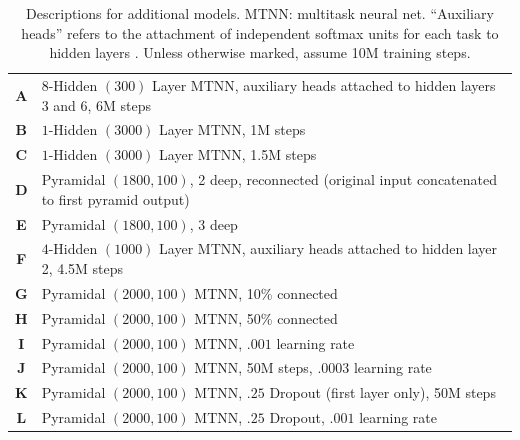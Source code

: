 \clearpage

\begin{table}[ht]
\centering
\caption{Descriptions for additional models. MTNN: multitask neural net.
  ``Auxiliary heads'' refers to the attachment of independent softmax units
  for each task to hidden layers \cite[see][]{szegedy2014going}. Unless
  otherwise marked, assume 10M training steps.}
\label{tab:model_descriptions}
\vskip 0.2in
\begin{tabular}{>{\bfseries}cl}
\toprule
A & $8$-Hidden $(300)$ Layer MTNN, auxiliary heads attached to hidden layers 3 and 6, 6M steps \\
B & $1$-Hidden $(3000)$ Layer MTNN, 1M steps \\
C & $1$-Hidden $(3000)$ Layer MTNN, 1.5M steps \\
D & Pyramidal $(1800, 100)$, 2 deep, reconnected (original input concatenated to first pyramid output) \\
E & Pyramidal $(1800, 100)$, 3 deep \\
F & $4$-Hidden $(1000)$ Layer MTNN, auxiliary heads attached to hidden layer 2, 4.5M steps \\
G & Pyramidal $(2000, 100)$ MTNN, 10\% connected \\
H & Pyramidal $(2000, 100)$ MTNN, 50\% connected \\
I & Pyramidal $(2000, 100)$ MTNN, $.001$ learning rate \\
J & Pyramidal $(2000, 100)$ MTNN, 50M steps, $.0003$ learning rate \\
K & Pyramidal $(2000, 100)$ MTNN, $.25$ Dropout (first layer only), 50M steps \\
L & Pyramidal $(2000, 100)$ MTNN, $.25$ Dropout, $.001$ learning rate \\
\bottomrule
\end{tabular}
\end{table}

